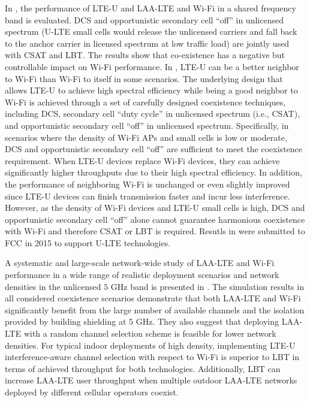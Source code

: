 \documentclass[12pt,onecolumn]{article}
\begin{document}
In \cite{U-LTE-Wi-Fi-Qualcomm-2014, LTE-U-Wi-Fi-LTE-U-Forum-2015, LTE-U-Qualcomm-2015, U-LTE-Wi-Fi-Qualcomm-FCC-2015}, the performance of LTE-U and LAA-LTE and Wi-Fi in a shared frequency band is evaluated. DCS and opportunistic secondary cell ``off'' in unlicensed spectrum (U-LTE small cells would release the unlicensed carriers and fall back to the anchor carrier in licensed spectrum at low traffic load) are jointly used with CSAT and LBT. The results show that co-existence has a negative but controllable impact on Wi-Fi performance. In \cite{U-LTE-Wi-Fi-Qualcomm-2014, LTE-U-Wi-Fi-LTE-U-Forum-2015, LTE-U-Qualcomm-2015}, LTE-U can be a better neighbor to Wi-Fi than Wi-Fi to itself in some scenarios. The underlying design that allows LTE-U to achieve high spectral efficiency while being a good neighbor to Wi-Fi is achieved through a set of carefully designed coexistence techniques, including DCS, secondary cell ``duty cycle'' in unlicensed spectrum (i.e., CSAT), and opportunistic secondary cell ``off'' in unlicensed spectrum. Specifically, in scenarios where the density of Wi-Fi APs and small cells is low or moderate, DCS and opportunistic secondary cell ``off'' are sufficient to meet the coexistence requirement. When LTE-U devices replace Wi-Fi devices, they can achieve significantly higher throughputs due to their high spectral efficiency. In addition, the performance of neighboring Wi-Fi is unchanged or even slightly improved since LTE-U devices can finish transmission faster and incur less interference. However, as the density of Wi-Fi devices and LTE-U small cells is high, DCS and opportunistic secondary cell ``off'' alone cannot guarantee harmonious coexistence with Wi-Fi and therefore CSAT or LBT is required. Resutls in \cite{LTE-U-Wi-Fi-LTE-U-Forum-2015, U-LTE-Wi-Fi-Qualcomm-FCC-2015} were submitted to FCC in 2015 to support U-LTE technologies.

A systematic and large-scale network-wide study of LAA-LTE and Wi-Fi performance in a wide range of realistic deployment scenarios and network densities in the unlicensed $5$ GHz band is presented in \cite{LTE-U-ICC-WS-2015}. The simulation results in all considered coexistence scenarios demonstrate that both LAA-LTE and Wi-Fi significantly benefit from the large number of available channels and the isolation provided by building shielding at $5$ GHz. They also suggest that deploying LAA-LTE with a random channel selection scheme is feasible for lower network densities. For typical indoor deployments of high density, implementing LTE-U interference-aware channel selection with respect to Wi-Fi is superior to LBT in terms of achieved throughput for both technologies. Additionally, LBT can increase LAA-LTE user throughput when multiple outdoor LAA-LTE networks deployed by different cellular operators coexist.
\end{document}
